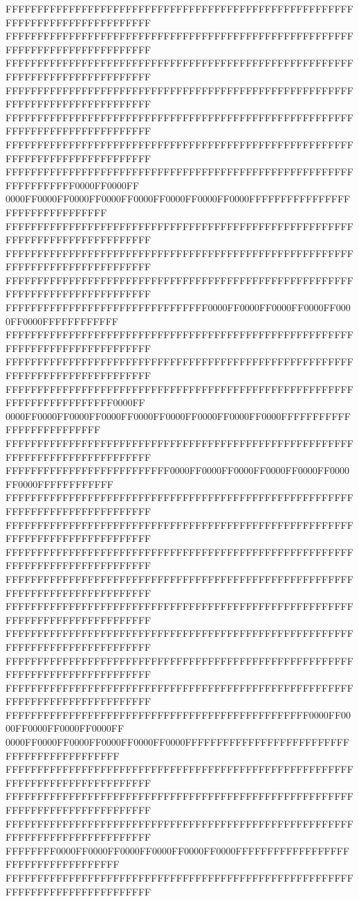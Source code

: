 FFFFFFFFFFFFFFFFFFFFFFFFFFFFFFFFFFFFFFFFFFFFFFFFFFFFFFFFFFFFFFFFFFFFFFFFFFFFFF
FFFFFFFFFFFFFFFFFFFFFFFFFFFFFFFFFFFFFFFFFFFFFFFFFFFFFFFFFFFFFFFFFFFFFFFFFFFFFF
FFFFFFFFFFFFFFFFFFFFFFFFFFFFFFFFFFFFFFFFFFFFFFFFFFFFFFFFFFFFFFFFFFFFFFFFFFFFFF
FFFFFFFFFFFFFFFFFFFFFFFFFFFFFFFFFFFFFFFFFFFFFFFFFFFFFFFFFFFFFFFFFFFFFFFFFFFFFF
FFFFFFFFFFFFFFFFFFFFFFFFFFFFFFFFFFFFFFFFFFFFFFFFFFFFFFFFFFFFFFFFFFFFFFFFFFFFFF
FFFFFFFFFFFFFFFFFFFFFFFFFFFFFFFFFFFFFFFFFFFFFFFFFFFFFFFFFFFFFFFFFFFFFFFFFFFFFF
FFFFFFFFFFFFFFFFFFFFFFFFFFFFFFFFFFFFFFFFFFFFFFFFFFFFFFFFFFFFFFFFFF0000FF0000FF
0000FF0000FF0000FF0000FF0000FF0000FF0000FF0000FFFFFFFFFFFFFFFFFFFFFFFFFFFFFFFF
FFFFFFFFFFFFFFFFFFFFFFFFFFFFFFFFFFFFFFFFFFFFFFFFFFFFFFFFFFFFFFFFFFFFFFFFFFFFFF
FFFFFFFFFFFFFFFFFFFFFFFFFFFFFFFFFFFFFFFFFFFFFFFFFFFFFFFFFFFFFFFFFFFFFFFFFFFFFF
FFFFFFFFFFFFFFFFFFFFFFFFFFFFFFFFFFFFFFFFFFFFFFFFFFFFFFFFFFFFFFFFFFFFFFFFFFFFFF
FFFFFFFFFFFFFFFFFFFFFFFFFFFFFFFF0000FF0000FF0000FF0000FF0000FF0000FFFFFFFFFFFF
FFFFFFFFFFFFFFFFFFFFFFFFFFFFFFFFFFFFFFFFFFFFFFFFFFFFFFFFFFFFFFFFFFFFFFFFFFFFFF
FFFFFFFFFFFFFFFFFFFFFFFFFFFFFFFFFFFFFFFFFFFFFFFFFFFFFFFFFFFFFFFFFFFFFFFFFFFFFF
FFFFFFFFFFFFFFFFFFFFFFFFFFFFFFFFFFFFFFFFFFFFFFFFFFFFFFFFFFFFFFFFFFFFFFFF0000FF
0000FF0000FF0000FF0000FF0000FF0000FF0000FF0000FF0000FFFFFFFFFFFFFFFFFFFFFFFFFF
FFFFFFFFFFFFFFFFFFFFFFFFFFFFFFFFFFFFFFFFFFFFFFFFFFFFFFFFFFFFFFFFFFFFFFFFFFFFFF
FFFFFFFFFFFFFFFFFFFFFFFFFF0000FF0000FF0000FF0000FF0000FF0000FF0000FFFFFFFFFFFF
FFFFFFFFFFFFFFFFFFFFFFFFFFFFFFFFFFFFFFFFFFFFFFFFFFFFFFFFFFFFFFFFFFFFFFFFFFFFFF
FFFFFFFFFFFFFFFFFFFFFFFFFFFFFFFFFFFFFFFFFFFFFFFFFFFFFFFFFFFFFFFFFFFFFFFFFFFFFF
FFFFFFFFFFFFFFFFFFFFFFFFFFFFFFFFFFFFFFFFFFFFFFFFFFFFFFFFFFFFFFFFFFFFFFFFFFFFFF
FFFFFFFFFFFFFFFFFFFFFFFFFFFFFFFFFFFFFFFFFFFFFFFFFFFFFFFFFFFFFFFFFFFFFFFFFFFFFF
FFFFFFFFFFFFFFFFFFFFFFFFFFFFFFFFFFFFFFFFFFFFFFFFFFFFFFFFFFFFFFFFFFFFFFFFFFFFFF
FFFFFFFFFFFFFFFFFFFFFFFFFFFFFFFFFFFFFFFFFFFFFFFFFFFFFFFFFFFFFFFFFFFFFFFFFFFFFF
FFFFFFFFFFFFFFFFFFFFFFFFFFFFFFFFFFFFFFFFFFFFFFFFFFFFFFFFFFFFFFFFFFFFFFFFFFFFFF
FFFFFFFFFFFFFFFFFFFFFFFFFFFFFFFFFFFFFFFFFFFFFFFFFFFFFFFFFFFFFFFFFFFFFFFFFFFFFF
FFFFFFFFFFFFFFFFFFFFFFFFFFFFFFFFFFFFFFFFFFFFFFFF0000FF0000FF0000FF0000FF0000FF
0000FF0000FF0000FF0000FF0000FF0000FFFFFFFFFFFFFFFFFFFFFFFFFFFFFFFFFFFFFFFFFFFF
FFFFFFFFFFFFFFFFFFFFFFFFFFFFFFFFFFFFFFFFFFFFFFFFFFFFFFFFFFFFFFFFFFFFFFFFFFFFFF
FFFFFFFFFFFFFFFFFFFFFFFFFFFFFFFFFFFFFFFFFFFFFFFFFFFFFFFFFFFFFFFFFFFFFFFFFFFFFF
FFFFFFFFFFFFFFFFFFFFFFFFFFFFFFFFFFFFFFFFFFFFFFFFFFFFFFFFFFFFFFFFFFFFFFFFFFFFFF
FFFFFFFF0000FF0000FF0000FF0000FF0000FF0000FFFFFFFFFFFFFFFFFFFFFFFFFFFFFFFFFFFF
FFFFFFFFFFFFFFFFFFFFFFFFFFFFFFFFFFFFFFFFFFFFFFFFFFFFFFFFFFFFFFFFFFFFFFFFFFFFFF
